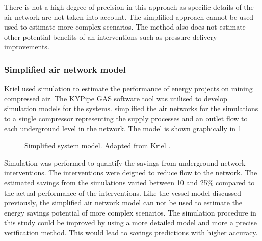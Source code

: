 There is not a high degree of precision in this approach as specific details of the air network are not taken into account. The simplified approach cannot be used used to estimate more complex scenarios. The method also does not estimate other potential benefits of an interventions such as pressure delivery improvements.

\subsubsection{Simplified air network model}
Kriel \cite{Kriel2014Masters} used simulation to estimate the performance of energy projects on mining compressed air. The KYPipe GAS software tool was utilised to develop simulation models for the systems. \cite{Kriel2014Masters} simplified the air networks for the simulations to a single compressor representing the supply processes and an outlet flow to each underground level in the network. The model is shown graphically in \cref{fig:kriel  model}
\begin{figure}[h!]
	\centering
	\caption[Simplified system model.]{Simplified system model. Adapted from Kriel \cite{Kriel2014Masters}.}
	\label{fig:kriel  model}
\end{figure}
\par 
Simulation was performed to quantify the savings from underground network interventions. The interventions were deigned to reduce flow to the network. The estimated savings from the simulations varied between 10 and 25\% compared to the actual performance of the interventions. Like the vessel model discussed previously, the simplified air network model can not be used to estimate the energy savings potential of more complex scenarios. The simulation procedure in this study could be improved by using a more detailed model and more a precise verification method. This would lead to savings predictions with higher accuracy. 

